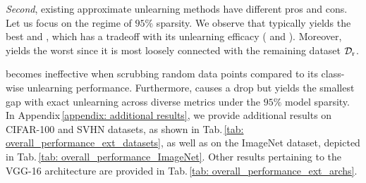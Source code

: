 
\textit{Second},  existing approximate unlearning methods have different pros and cons. Let us focus on the regime of $95\%$ sparsity.  We observe that {\FT}  typically yields the best {\RA} and {\TA}, which has a tradeoff with its unlearning efficacy ({\UA} and {\MIAF}). Moreover, {\GA} yields the worst {\RA} since it is most loosely connected with the remaining dataset $\mathcal D_\mathrm{r}$.  {{\FF} becomes ineffective when scrubbing random data points compared to its class-wise unlearning performance. 
Furthermore,    {\IU} causes a {\TA} drop but yields the smallest gap with exact unlearning across diverse metrics under the $95\%$ model sparsity.
In Appendix\,\ref{appendix: additional results}, we provide additional results on CIFAR-100 and SVHN datasets, as shown in Tab.\,\ref{tab: overall_performance_ext_datasets}, as well as on the ImageNet dataset, depicted in Tab.\,\ref{tab: overall_performance_ImageNet}. Other results pertaining to the VGG-16 architecture are  provided in Tab.\,\ref{tab: overall_performance_ext_archs}.




}
